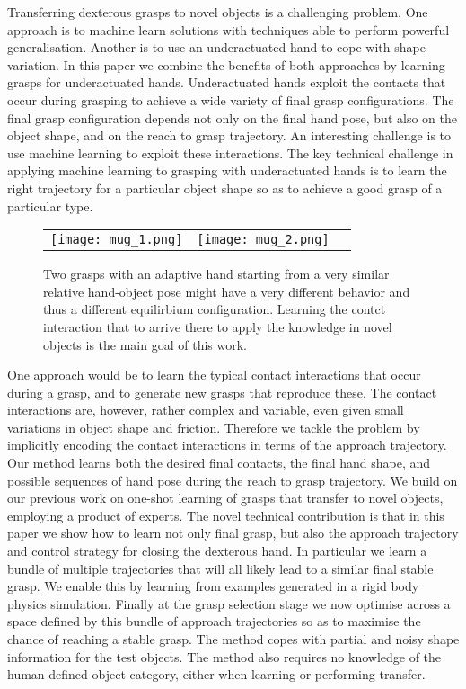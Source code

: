 Transferring dexterous grasps to novel objects is a challenging problem. One approach is to machine learn solutions with techniques able to perform powerful generalisation. Another is to use an underactuated hand to cope with shape variation. In this paper we combine the benefits of both approaches by learning grasps for underactuated hands. Underactuated hands exploit the contacts that occur during grasping to achieve a wide variety of final grasp configurations. The final grasp configuration depends not only on the final hand pose, but also on the object shape, and on the reach to grasp trajectory. An interesting challenge is to use machine learning to exploit these interactions. The key technical challenge in applying machine learning to grasping with underactuated hands is to learn the right trajectory for a particular object shape so as to achieve a good grasp of a particular type. 

\begin{figure}
  \centering
  \begin{tabular}{ccc}
  \texttt{[image: mug\_1.png]} &
  \texttt{[image: mug\_2.png]} \\
  \end{tabular}
  \caption{Two grasps with an adaptive hand starting from a very similar relative hand-object pose might have a very different behavior and thus a different equilirbium configuration. Learning the contct interaction that to arrive there to apply the knowledge in novel objects is the main goal of this work.}
  \label{fig:two_grasps}
\end{figure}

One approach would be to learn the typical contact interactions that occur during a grasp, and to generate new grasps that reproduce these. The contact interactions are, however, rather complex and variable, even given small variations in object shape and friction. Therefore we tackle the problem by implicitly encoding the contact interactions in terms of the approach trajectory. Our method learns both the desired final contacts, the final hand shape, and possible sequences of hand pose during the reach to grasp trajectory. We build on our previous work on one-shot learning of grasps that transfer to novel objects, employing a product of experts. The novel technical contribution is that in this paper we show how to learn not only final grasp, but also the approach trajectory and control strategy for closing the dexterous hand. In particular we learn a bundle of multiple trajectories that will all likely lead to a similar final stable grasp. We enable this by learning from examples generated in a rigid body physics simulation. Finally at the grasp selection stage we now optimise across a space defined by this bundle of approach trajectories so as to maximise the chance of reaching a stable grasp. The method copes with partial and noisy shape information for the test objects. The method also requires no knowledge of the human defined object category, either when learning or performing transfer.

